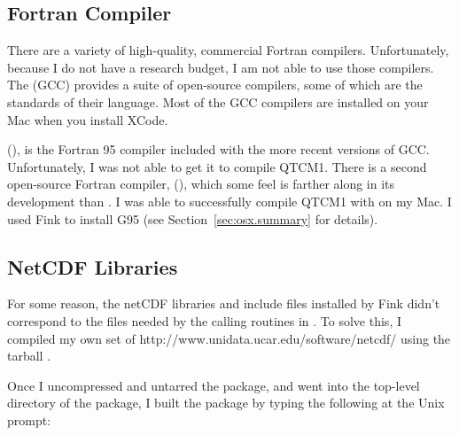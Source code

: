 \subsection{Fortran Compiler}

There are a variety of high-quality, commercial Fortran compilers.
Unfortunately, because I do not have a research budget, I am not able
to use those compilers.  The 
(GCC) provides a suite of open-source compilers, some of which are the
standards of their language.  Most of the GCC compilers are installed
on your Mac when you install XCode.

(), is the Fortran 95 compiler included with the more
recent versions of GCC.
Unfortunately, I was not able to get it to compile QTCM1.
There is a second open-source Fortran compiler,
 (),
which some feel is farther along in its development than .
I was able to successfully compile QTCM1 with  on my Mac.
I used Fink to install G95
(see Section~\ref{sec:osx.summary} for details).




\subsection{NetCDF Libraries}   \label{sec:netcdf}

For some reason, the netCDF libraries and include files
installed by Fink didn't correspond to the files needed
by the calling routines in .  To solve this, I compiled
my own set of 
%
	{http://www.unidata.ucar.edu/software/netcdf/}
using the tarball 
%
        {}.

Once I uncompressed and untarred the package, and went into 
the top-level directory of the package, I built the package by typing
the following at the Unix prompt:

\begin{codeblock}
\end{codeblock}

